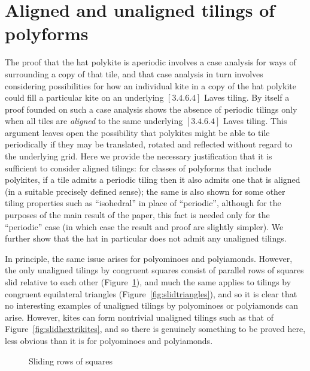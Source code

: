 \section{Aligned and unaligned tilings of polyforms}
\label{sec:align}

The proof that the hat polykite is aperiodic
involves a case analysis for ways of surrounding a copy of that tile,
and that case analysis in turn involves considering possibilities for
how an individual kite in a copy of the hat polykite could fill a
particular kite on an underlying $[3.4.6.4]$ Laves tiling.  By itself
a proof founded on such a case analysis shows the absence of
periodic tilings only when all tiles are \textit{aligned} to the same 
underlying $[3.4.6.4]$ Laves tiling.  This argument leaves open the
possibility that polykites might be able to tile periodically if they
may be translated, rotated and reflected without regard to the underlying grid.
Here we
provide the necessary justification that it is sufficient to consider
aligned tilings: for classes of polyforms that include
polykites, if a tile admits a periodic tiling then it also admits one
that is aligned (in a suitable precisely defined sense); the same is
also shown for some other tiling properties such as ``isohedral'' in
place of ``periodic'', although for the purposes of the main result of
the paper, this fact is needed only for the ``periodic'' case (in which case
the result and proof are slightly simpler).  We further show that the
hat in particular does not admit any unaligned tilings.

In principle, the same issue arises for polyominoes and polyiamonds.
However, the only unaligned tilings by congruent squares consist of
parallel rows of squares slid relative to each other
(Figure~\ref{fig:slidsquares}), and much the same applies to tilings
by congruent equilateral triangles (Figure~\ref{fig:slidtriangles}),
and so it is clear that no interesting examples of unaligned tilings
by polyominoes or polyiamonds can arise.
However, kites can form nontrivial unaligned tilings such as that of
Figure~\ref{fig:slidhextrikites}, and so there is genuinely something to
be proved here, less obvious than it is for polyominoes and
polyiamonds.

\begin{figure}[htp!]
\begin{center}
\end{center}
\caption{Sliding rows of squares}
\label{fig:slidsquares}
\end{figure}

